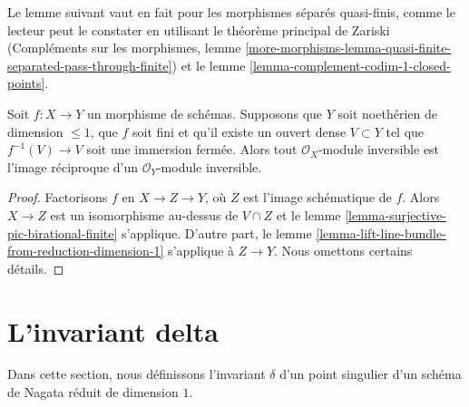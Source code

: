 \noindent
Le lemme suivant vaut en fait pour les morphismes séparés quasi-finis,
comme le lecteur peut le constater en utilisant le théorème principal de Zariski
(Compléments sur les morphismes, lemme
\ref{more-morphisms-lemma-quasi-finite-separated-pass-through-finite})
et le lemme \ref{lemma-complement-codim-1-closed-points}.

\begin{lemma}
\label{lemma-surjection-on-pic-quasi-finite}
Soit $f : X \to Y$ un morphisme de schémas. Supposons que
$Y$ soit noethérien de dimension $\leq 1$, que $f$ soit fini et
qu'il existe un ouvert dense $V \subset Y$ tel que
$f^{-1}(V) \to V$ soit une immersion fermée. Alors tout
$\mathcal{O}_X$-module inversible est l'image réciproque d'un $\mathcal{O}_Y$-module inversible.
\end{lemma}

\begin{proof}
Factorisons $f$ en $X \to Z \to Y$, où $Z$ est l'image schématique
de $f$. Alors $X \to Z$ est un isomorphisme au-dessus de $V \cap Z$
et le lemme \ref{lemma-surjective-pic-birational-finite} s'applique.
D'autre part, le
lemme \ref{lemma-lift-line-bundle-from-reduction-dimension-1}
s'applique à $Z \to Y$. Nous omettons certains détails.
\end{proof}








\section{L'invariant delta}
\label{section-delta-invariant}

\noindent
Dans cette section, nous définissons l'invariant $\delta$ d'un point singulier
d'un schéma de Nagata réduit de dimension $1$.

